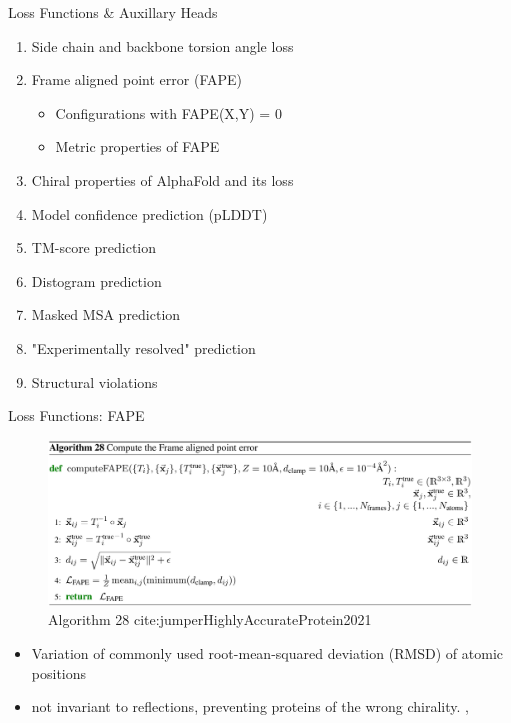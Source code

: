 \documentclass[presentation, smaller]{beamer}
\begin{document}
\begin{frame}[label={sec:orga46c4c3}]{Loss Functions \& Auxillary Heads \cite{jumperHighlyAccurateProtein2021}}
\begin{enumerate}
\item Side chain and backbone torsion angle loss
\item Frame aligned point error (FAPE)
\begin{itemize}
\item Configurations with FAPE(X,Y) = 0
\item Metric properties of FAPE
\end{itemize}
\item Chiral properties of AlphaFold and its loss
\item Model confidence prediction (pLDDT)
\item TM-score prediction
\item Distogram prediction
\item Masked MSA prediction
\item "Experimentally resolved" prediction
\item Structural violations
\end{enumerate}
\end{frame}

\begin{frame}[label={sec:orga020f36}]{Loss Functions: FAPE}
\begin{figure}[htbp]
\centering
\includegraphics[width=.9\linewidth]{./imgs/algo28_fape.png}
{Algorithm 28 cite:jumperHighlyAccurateProtein2021}
\end{figure}


\begin{itemize}
\item Variation of commonly used root-mean-squared deviation (RMSD) of atomic positions
\item not invariant to reflections, preventing proteins of the wrong chirality. \cite{rubieraAlphaFoldHereWhat}, \cite{jumperHighlyAccurateProtein2021}
\end{itemize}
\end{frame}
\end{document}
